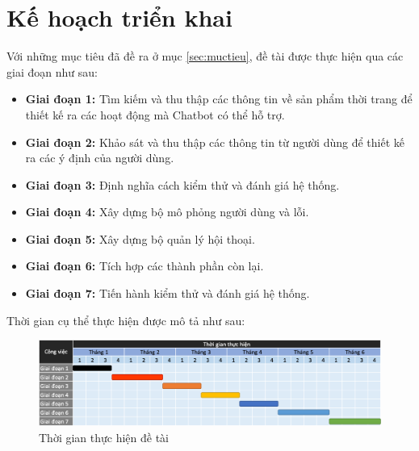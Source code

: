 \chapter {Kế hoạch triển khai}
Với những mục tiêu đã đề ra ở mục \ref{sec:muctieu},
đề tài được thực hiện qua các giai đoạn như sau:

\begin{itemize}
    \item \textbf{Giai đoạn 1:} Tìm kiếm và thu thập các thông tin
    về sản phẩm thời trang để thiết kế ra các hoạt động mà Chatbot
    có thể hỗ trợ.
    \item \textbf{Giai đoạn 2:} Khảo sát và thu thập các thông tin
    từ người dùng để thiết kế ra các ý định của người dùng.
    \item \textbf{Giai đoạn 3:} Định nghĩa cách kiểm thử và đánh giá
    hệ thống.
    \item \textbf{Giai đoạn 4:} Xây dựng bộ mô phỏng người dùng và lỗi.
    \item \textbf{Giai đoạn 5:} Xây dựng bộ quản lý hội thoại.
    \item \textbf{Giai đoạn 6:} Tích hợp các thành phần còn lại.
    \item \textbf{Giai đoạn 7:} Tiến hành kiểm thử và đánh giá hệ thống.
\end{itemize}

Thời gian cụ thể thực hiện được mô tả như sau:

\begin{figure}[ht]
    \centering
    \includegraphics[width=1\textwidth]{thesis/chatbot-outline/kehoach/timeline.png}
    \caption{Thời gian thực hiện đề tài}
    \label{fig:timeline}
\end{figure}
